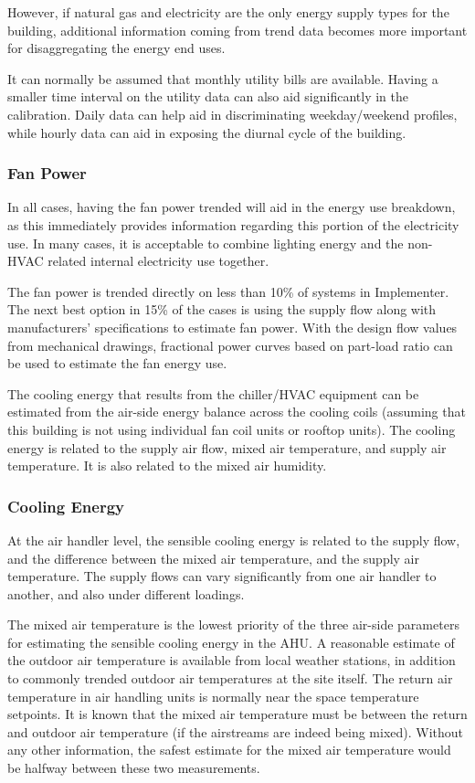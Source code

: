 However, if natural gas and electricity are the only energy supply types
for the building, additional information coming from trend data becomes
more important for disaggregating the energy end uses. 

It can normally be assumed that monthly utility bills are available.
Having a smaller time interval on the utility data can also aid
significantly in the calibration. Daily data can help aid in
discriminating weekday/weekend profiles, while hourly data can aid in
exposing the diurnal cycle of the building. 


\subsubsection{Fan Power}

In all cases, having the fan power trended will aid in the energy use
breakdown, as this immediately provides information regarding this
portion of the electricity use.  In many cases, it is acceptable to
combine lighting energy and the non-HVAC related internal electricity
use together. 

The fan power is trended directly on less than 10\% of systems in
Implementer. The next best option in 15\% of the cases is using the
supply flow along with manufacturers' specifications to estimate
fan power. With the design flow values from mechanical drawings,
fractional power curves based on part-load ratio can be used to estimate
the fan energy use. 

The cooling energy that results from the chiller/HVAC equipment can be
estimated from the air-side energy balance across the cooling coils
(assuming that this building is not using individual fan coil units or
rooftop units). The cooling energy is related to the supply air flow,
mixed air temperature, and supply air temperature. It is also related to the mixed
air humidity. 


\subsubsection{Cooling Energy} 

At the air handler level, the sensible cooling energy is related to the
supply flow, and the difference between the mixed air temperature, and
the supply air temperature. The supply flows can vary significantly from
one air handler to another, and also under different loadings. 

The mixed air temperature is the lowest priority of the three air-side
parameters for estimating the sensible cooling energy in the AHU. A
reasonable estimate of the outdoor air temperature is available from
local weather stations, in addition to commonly trended outdoor air
temperatures at the site itself. The return air temperature in air
handling units is normally near the space temperature setpoints. It is
known that the mixed air temperature must be between the return and
outdoor air temperature (if the airstreams are indeed being mixed).
Without any other information, the safest estimate for the mixed air
temperature would be halfway between these two measurements. 

